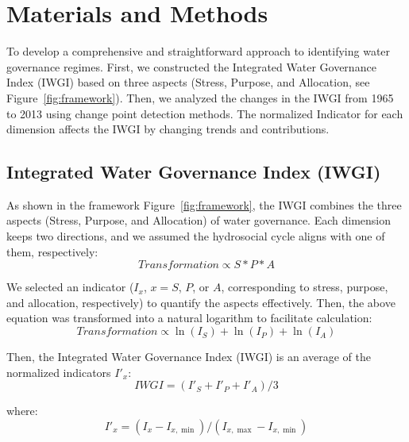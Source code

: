 \documentclass[draft]{agujournal2019}
\begin{document}
\section{Materials and Methods}\label{sec11}


To develop a comprehensive and straightforward approach to identifying water governance regimes. First, we constructed the Integrated Water Governance Index (IWGI) based on three aspects (Stress, Purpose, and Allocation, see Figure~\ref{fig:framework}). Then, we analyzed the changes in the IWGI from 1965 to 2013 using change point detection methods. The normalized Indicator for each dimension affects the IWGI by changing trends and contributions.

\subsection{Integrated Water Governance Index (IWGI)}

As shown in the framework Figure~\ref{fig:framework}, the IWGI combines the three aspects (Stress, Purpose, and Allocation) of water governance. Each dimension keeps two directions, and we assumed the hydrosocial cycle aligns with one of them, respectively:
	\begin{equation}
		Transformation \propto S*P*A
	\end{equation}

	We selected an indicator ($I_x$, $x=S$, $P$, or $A$, corresponding to stress, purpose, and allocation, respectively) to quantify the aspects effectively. Then, the above equation was transformed into a natural logarithm to facilitate calculation:
	\begin{equation}
		Transformation \propto \ln(I_S) + \ln(I_P) + \ln(I_A)
	\end{equation}

	Then, the Integrated Water Governance Index (IWGI) is an average of the normalized indicators $I'_x$:
	\begin{equation}
		IWGI = (I'_S + I'_P + I'_A) / 3
	\end{equation}

	where:
	\begin{equation}
		I'_x = (I_x - I_{x, \min}) / (I_{x, \max} - I_{x, \min})
	\end{equation}
\end{document}
